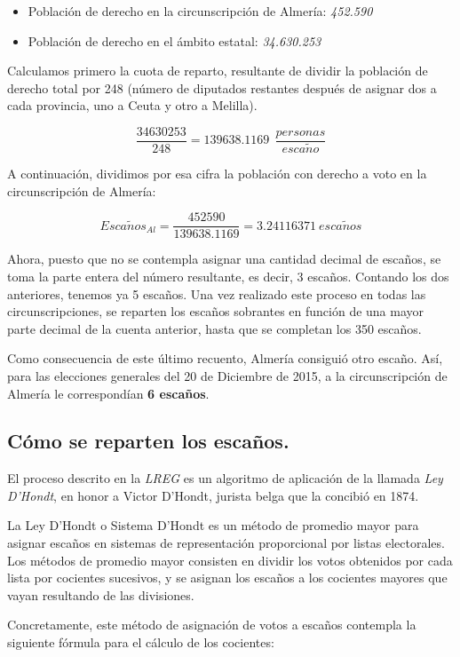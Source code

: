 \documentclass[11pt]{article}
\newcommand\console[1]{{\inconsolata #1}}
\begin{document}
	\console{
	\begin{itemize}
	\item Población de derecho en la circunscripción de Almería: \textit{452.590}
	\item Población de derecho en el ámbito estatal: \textit{34.630.253}
	\end{itemize}
	}
	
	Calculamos primero la cuota de reparto, resultante de dividir la población de derecho total por 248 (número de diputados restantes después de asignar dos a cada provincia, uno a Ceuta y otro a Melilla).

	$$\dfrac{34630253}{248} = 139638.1169\ \ \frac{personas}{esca\tilde{n}o}$$
	
	A continuación, dividimos por esa cifra la población con derecho a voto en la circunscripción de Almería:
	
	$$Esca\tilde{n}os_{Al} = \dfrac{452590}{139638.1169} = 3.24116371\ esca\tilde{n}os$$

  Ahora, puesto que no se contempla asignar una cantidad decimal de escaños, se toma la parte entera del número resultante, es decir, 3 escaños. Contando los dos anteriores, tenemos ya 5 escaños. Una vez realizado este proceso en todas las circunscripciones, se reparten los escaños sobrantes en función de una mayor parte decimal de la cuenta anterior, hasta que se completan los 350 escaños.
  
  Como consecuencia de este último recuento, Almería consiguió otro escaño. Así, para las elecciones generales del 20 de Diciembre de 2015, a la circunscripción de Almería le correspondían \textbf{6 escaños}.
  
	\subsection{Cómo se reparten los escaños.}
	
	El proceso descrito en la \textit{LREG} es un algoritmo de aplicación de la llamada \textit{Ley D'Hondt}, en honor a Victor D'Hondt, jurista belga que la concibió en 1874.
	
	La Ley D'Hondt o Sistema D'Hondt es un método de promedio mayor para asignar escaños en sistemas de representación proporcional por listas electorales. Los métodos de promedio mayor consisten en dividir los votos obtenidos por cada lista por cocientes sucesivos, y se asignan los escaños a los cocientes mayores que vayan resultando de las divisiones.
	
	Concretamente, este método de asignación de votos a escaños contempla la siguiente fórmula para el cálculo de los cocientes:
	
\end{document}
